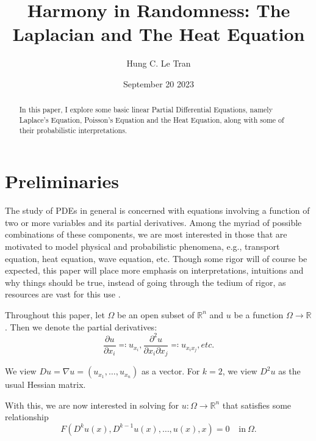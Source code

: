 \documentclass[openany, amssymb, psamsfonts]{amsart}
\title{Harmony in Randomness: The Laplacian and The Heat Equation}
\author{Hung C. Le Tran}
\date{September 20 2023}
\theoremstyle{definition}
\numberwithin{equation}{section}
\newcommand{\bbr}{\mathbb{R}}
\newcommand{\bbz}{\mathbb{Z}}
\begin{document}
\begin{abstract}
    In this paper, I explore some basic linear Partial Differential Equations, namely Laplace's Equation, Poisson's Equation and the Heat Equation, along with some of their probabilistic interpretations. 
\end{abstract}

\maketitle

\tableofcontents

\section{Preliminaries}
The study of PDEs in general is concerned with equations involving a function of two or more variables and its partial derivatives. Among the myriad of possible combinations of these components, we are most interested in those that are motivated to model physical and probabilistic phenomena, e.g., transport equation, heat equation, wave equation, etc. Though some rigor will of course be expected, this paper will place more emphasis on interpretations, intuitions and why things should be true, instead of going through the tedium of rigor, as resources are vast for this use \cite{Evans}.

Throughout this paper, let $\Omega$ be an open subset of $\bbr^n$ and $u$ be a function $\Omega \to \bbr$. Then we denote the partial derivatives: \[
    \dfrac{\partial u}{\partial x_i}\eqqcolon u_{x_i},
    \dfrac{\partial^2 u}{\partial x_i \partial x_j}\eqqcolon u_{x_ix_j}, etc.
\]


We view $Du = \nabla u = (u_{x_1}, \ldots, u_{x_n})$ as a vector. For $k = 2$, we view $D^2 u$ as the usual Hessian matrix.

With this, we are now interested in solving for $u: \Omega \to \bbr^n$ that satisfies some relationship \[
    F(D^k u(x), D^{k-1}u(x), \ldots, u(x), x) = 0 \;\;\;\:\text{in}\: \Omega.
\]
\end{document}
